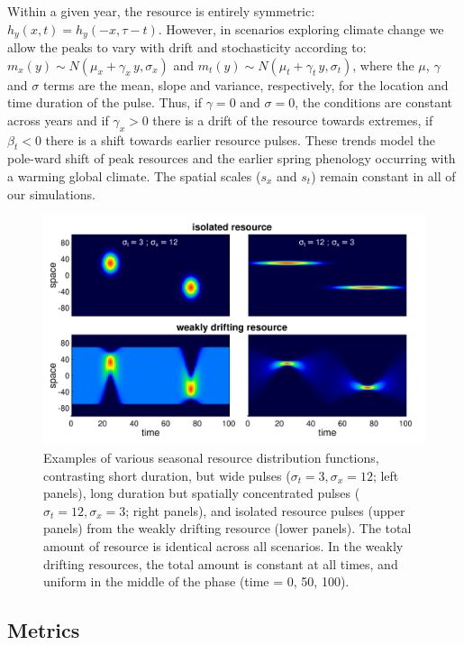 \documentclass[utf8]{frontiersSCNS} %
\begin{document}
	Within a given year, the resource is entirely symmetric: $h_y(x,t) = h_y(-x, \tau-t)$. However, in scenarios exploring climate change we allow the peaks to vary with drift and stochasticity according to: $m_x(y) \sim {N}(\mu_x + \gamma_x\,y, \sigma_x)$ and $m_t(y) \sim {N}(\mu_t + \gamma_t\,y, \sigma_t)$, where the $\mu$, $\gamma$ and $\sigma$ terms are the mean, slope and variance, respectively, for the location and time duration of the pulse. Thus, if $\gamma=0$ and $\sigma=0$, the conditions are constant across years and if $\gamma_x > 0$ there is a drift of the resource towards extremes, if $\beta_t < 0$ there is a shift towards earlier resource pulses. These trends model the pole-ward shift of peak resources and the earlier spring phenology occurring with a warming global climate. The spatial scales ($s_x$ and $s_t$) remain constant in all of our simulations. 
	
	\begin{figure}[t!]
		\includegraphics[width = \textwidth]{figures/ResourceExamples.png}
		
		\caption{\label{fig_ResourceExamples}  Examples of various seasonal resource distribution functions, contrasting short duration, but wide pulses ($\sigma_t = 3, \sigma_x = 12$; left panels), long duration but spatially concentrated pulses ($\sigma_t = 12, \sigma_x = 3$; right panels), and isolated resource pulses (upper panels) from the weakly drifting resource (lower panels). The total amount of resource is identical across all scenarios. In the weakly drifting resources, the total amount is constant at all times, and uniform in the middle of the phase (time = 0, 50, 100).}
	\end{figure}
	
	\subsection{Metrics}
	
\end{document}
